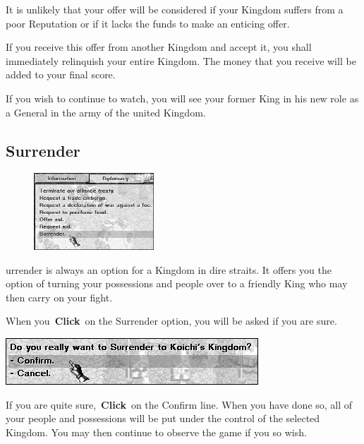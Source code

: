 It is unlikely that your offer will be considered if your Kingdom suffers from a poor Reputation or if it lacks the funds to make an enticing offer.

If you receive this offer from another Kingdom and accept it, you shall immediately relinquish your entire Kingdom. The money that you receive will be added to your final score.

If you wish to continue to watch, you will see your former King in his new role as a General in the army of the united Kingdom.

\subsection{Surrender}

\begin{figure}
	\vspace{-20pt}
	\begin{center}
		\includegraphics[width=0.4\textwidth]{Idimplomacy_surrender}
	\end{center}
	\vspace{-20pt}
\end{figure}

urrender is always an option for a Kingdom in dire straits. It offers you the option of turning your possessions and people over to a friendly King who may then carry on your fight.

When you \textbf{Click} on the Surrender option, you will be asked if you are sure.

\begin{center}
	\includegraphics[width=0.7\linewidth]{Isurrender_responce}
\end{center}

If you are quite sure, \textbf{Click} on the Confirm line. When you have done so, all of your people and possessions will be put under the control of the selected Kingdom. You may then continue to observe the game if you so wish.

